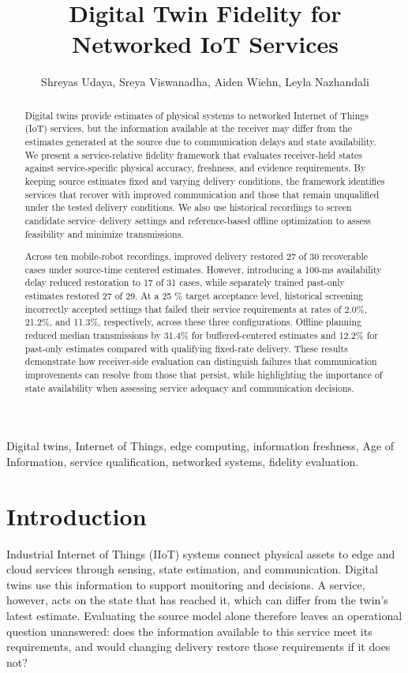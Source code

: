\documentclass[journal]{IEEEtran}
\title{Digital Twin Fidelity for Networked IoT Services}
\author{Shreyas Udaya, Sreya Viswanadha, Aiden Wiehn, Leyla Nazhandali}
\newcommand{\revision}[1]{#1}
\begin{document}
\maketitle

\begin{abstract}
Digital twins provide estimates of physical systems to networked Internet of Things (IoT) services, but the information available at the receiver may differ from the estimates generated at the source due to communication delays and state availability. We present a service-relative fidelity framework that evaluates receiver-held states against service-specific physical accuracy, freshness, and evidence requirements. By keeping source estimates fixed and varying delivery conditions, the framework identifies services that recover with improved communication and those that remain unqualified under the tested delivery conditions. We also use historical recordings to screen candidate service–delivery settings and reference-based offline optimization to assess feasibility and minimize transmissions.

Across ten mobile-robot recordings, improved delivery restored 27 of 30 recoverable cases under source-time centered estimates. However, introducing a 100-ms availability delay reduced restoration to 17 of 31 cases, while separately trained past-only estimates restored 27 of 29. At a 25 \% target acceptance level, historical screening incorrectly accepted settings that failed their service requirements at rates of 2.0\%, 21.2\%, and 11.3\%, respectively, across these three configurations. Offline planning reduced median transmissions by 31.4\% for buffered-centered estimates and 12.2\% for past-only estimates compared with qualifying fixed-rate delivery. These results demonstrate how receiver-side evaluation can distinguish failures that communication improvements can resolve from those that persist, while highlighting the importance of state availability when assessing service adequacy and communication decisions.
\end{abstract}

\begin{IEEEkeywords}
Digital twins, Internet of Things, edge computing, information
freshness, Age of Information, service qualification, networked
systems, fidelity evaluation.
\end{IEEEkeywords}

\section{Introduction}
\label{sec:introduction}
\revision{Industrial Internet of Things (IIoT) systems connect physical
assets to edge and cloud services through sensing, state estimation, and
communication. Digital twins use this information to support monitoring
and decisions. A service, however, acts on the state that has reached it,
which can differ from the twin's latest estimate. Evaluating the source
model alone therefore leaves an operational question unanswered: does the
information available to this service meet its requirements, and would
changing delivery restore those requirements if it does not?}
\end{document}
